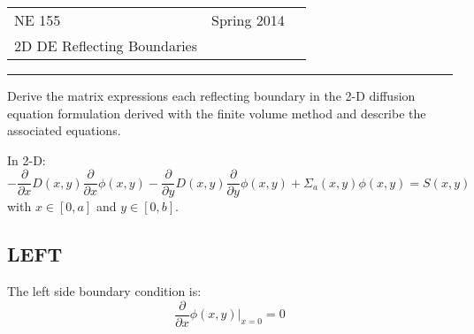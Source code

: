 \documentclass[12pt]{article}
\begin{document}
 

\begin{flushright}
\begin{tabular}{p{5in} r l}
NE 155 & Spring 2014 \\
2D DE Reflecting Boundaries
\end{tabular}
\end{flushright}
\rule[1ex]{\textwidth}{.1pt}

%
%
%


Derive the matrix expressions each reflecting boundary in the 2-D diffusion equation formulation derived with the finite volume method and describe the associated equations. 

In 2-D:
\[-\frac{\partial}{\partial x}D(x,y)\frac{\partial}{\partial x} \phi(x,y) -\frac{\partial}{\partial y}D(x,y)\frac{\partial}{\partial y} \phi(x,y) + \Sigma_a(x,y) \phi(x,y) = S(x,y)\]
%
with $x \in [0,a]$ and $y \in [0,b]$.


\subsection*{LEFT}
The left side boundary condition is:
\[\frac{\partial }{\partial x} \phi(x,y)\big|_{x=0} = 0\]
\end{document}
